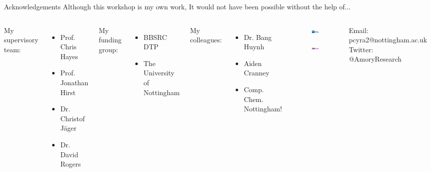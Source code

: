 \begin{frame}{Acknowledgements}
Although this workshop is my own work, It would not have been possible without the help of...
\newline
\begin{columns}
My supervisory team:
\begin{itemize}
\item Prof. Chris Hayes
\item Prof. Jonathan Hirst
\item Dr. Christof J\"{a}ger
\item Dr. David Rogers
\end{itemize}

My funding group:
\begin{itemize}
\item BBSRC DTP
\item The University of Nottingham
\end{itemize}

My colleagues:
\begin{itemize}
\item Dr. Bang Huynh
\item Aiden Cranney
\item Comp. Chem. Nottingham! 
\end{itemize}
\begin{multicols}{2}
\centering
\begin{figure}
\includegraphics[height=0.08\textheight]{../Graphics/UoN_gradient_logo_CMYK}
\end{figure}
\begin{figure}
\includegraphics[height=0.08\textheight]{../Graphics/UKRI_BBSR_Council-Logo_Horiz-CMYK}
\end{figure}
\end{multicols}
\makeatletter
Email: pcyra2@nottingham.ac.uk \\
Twitter: @AmoryResearch
\makeatother
\end{columns}
\end{frame}